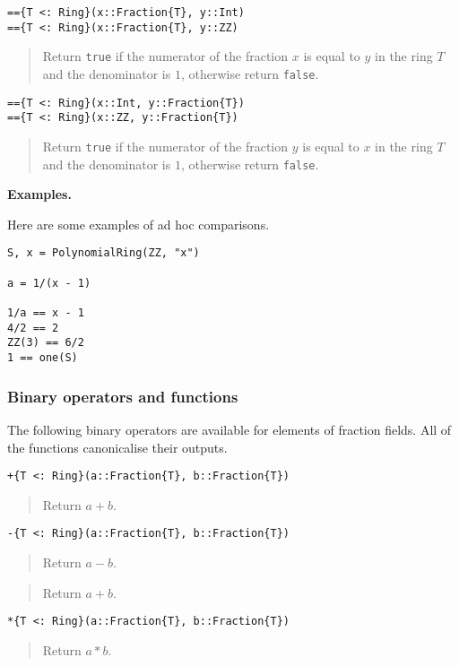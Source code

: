 \documentclass[a4paper,10pt]{article}
\newcommand{\code}{\lstinline}
\newcommand{\desc}[1]{\vspace{-3mm}\begin{quote}#1\end{quote}}
\begin{document}
{{{\begin{lstlisting}
=={T <: Ring}(x::Fraction{T}, y::Int)
=={T <: Ring}(x::Fraction{T}, y::ZZ)
\end{lstlisting}

\desc{Return \code{true} if the numerator of the fraction $x$ is equal to $y$
in the ring $T$ and the denominator is $1$, otherwise return \code{false}.}

\begin{lstlisting}
=={T <: Ring}(x::Int, y::Fraction{T})
=={T <: Ring}(x::ZZ, y::Fraction{T})
\end{lstlisting}

\desc{Return \code{true} if the numerator of the fraction $y$ is equal to $x$
in the ring $T$ and the denominator is $1$, otherwise return \code{false}.}

\textbf{Examples.}

Here are some examples of ad hoc comparisons.

\begin{lstlisting}
S, x = PolynomialRing(ZZ, "x")

a = 1/(x - 1)

1/a == x - 1
4/2 == 2
ZZ(3) == 6/2
1 == one(S)
\end{lstlisting}

\subsubsection{Binary operators and functions}

The following binary operators are available for elements of fraction fields.
All of the functions canonicalise their outputs.

\begin{lstlisting}
+{T <: Ring}(a::Fraction{T}, b::Fraction{T})
\end{lstlisting}

\desc{Return $a + b$.}

\begin{lstlisting}
-{T <: Ring}(a::Fraction{T}, b::Fraction{T})
\end{lstlisting}

\desc{Return $a - b$.}

\desc{Return $a + b$.}

\begin{lstlisting}
*{T <: Ring}(a::Fraction{T}, b::Fraction{T})
\end{lstlisting}

\desc{Return $a*b$.}

}}}
\end{document}

